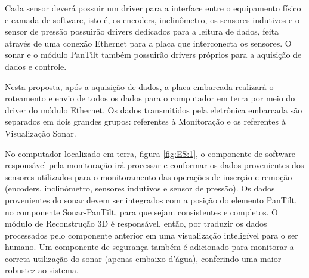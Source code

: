 
Cada sensor deverá possuir um driver para a interface entre o equipamento físico
e camada de software, isto é, os encoders, inclinômetro, os sensores indutivos e
o sensor de pressão possuirão drivers dedicados para a leitura de dados, feita
através de uma conexão Ethernet para a placa que interconecta os sensores. O
sonar e o módulo PanTilt também possuirão drivers próprios para a aquisição de
dados e controle.

Nesta proposta, após a aquisição de dados, a placa embarcada realizará o
roteamento e envio de todos os dados para o computador em terra por meio do
driver do módulo Ethernet.  Os dados transmitidos pela eletrônica embarcada são
separados em dois grandes grupos: referentes à Monitoração e os referentes à
Visualização Sonar.

No computador localizado em terra, figura \ref{fig:ES:1}, o componente de
software responsável pela monitoração irá processar e conformar os dados
provenientes dos sensores utilizados para o monitoramento das operações de
inserção e remoção (encoders, inclinômetro, sensores indutivos e sensor de
pressão). Os dados provenientes do sonar devem ser integrados com a posição do
elemento PanTilt, no componente Sonar-PanTilt, para que sejam consistentes e
completos.  O módulo de Reconstrução 3D é responsável, então, por traduzir os
dados processados pelo componente anterior em uma visualização inteligível para
o ser humano.  Um componente de segurança também é adicionado para monitorar a
correta utilização do sonar (apenas embaixo d’água), conferindo uma maior
robustez ao sistema.


